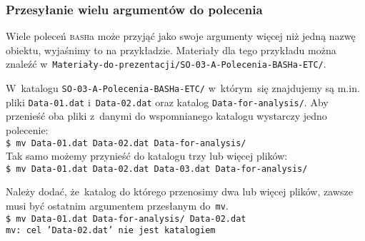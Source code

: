 \documentclass[10pt,t]{beamer}
\begin{document}
\begin{frame}
  \frametitle{Przesyłanie wielu argumentów do polecenia}


  Wiele poleceń \textsc{bash}a może przyjąć jako swoje argumenty więcej
  niż jedną nazwę obiektu, wyjaśnimy to na przykładzie. Materiały
  dla tego przykładu można znaleźć
  w~\texttt{Materiały-do-prezentacji/SO-03-A-Polecenia-BASHa-ETC/}.

  W~katalogu \texttt{SO-03-A-Polecenia-BASHa-ETC/} w~którym~się znajdujemy
  są m.in. pliki \texttt{Data-01.dat} i~\texttt{Data-02.dat} oraz katalog
  \texttt{Data-for-analysis/}. Aby przenieść oba pliki z~danymi do
  wspomnianego katalogu wystarczy jedno polecenie: \\
  \texttt{\$ mv Data-01.dat Data-02.dat Data-for-analysis/} \\
  Tak samo możemy przynieść do katalogu trzy lub więcej plików: \\
  \texttt{\$ mv Data-01.dat Data-02.dat Data-03.dat Data-for-analysis/}

  Należy dodać, że~katalog do którego przenosimy dwa lub więcej plików,
  \alert{zawsze} musi być ostatnim argumentem przesłanym do~\texttt{mv}. \\
  \texttt{\$ mv Data-01.dat Data-for-analysis/ Data-02.dat} \\
  \texttt{mv: cel 'Data-02.dat' nie jest katalogiem}

\end{frame}
\end{document}
